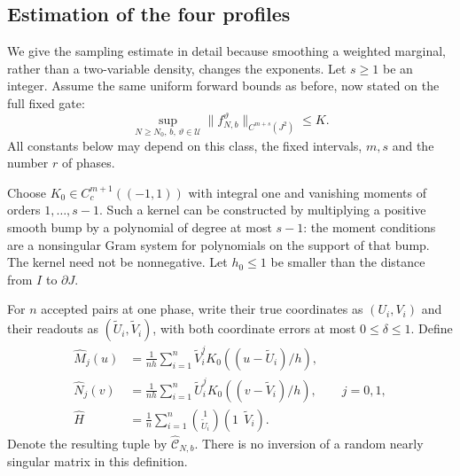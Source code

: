 \subsection{Estimation of the four profiles}

We give the sampling estimate in detail because smoothing a weighted
marginal, rather than a two-variable density, changes the exponents.
Let $s\ge1$ be an integer.  Assume the same uniform forward bounds
as before, now stated on the full fixed gate:
\[
 \sup_{N\ge N_0,\,b,\,\vartheta\in\mathscr U}
                   \|f_{N,b}^{\vartheta}\|_{C^{m+s}(J^2)}\le K.
\]
All constants below may depend on this class, the fixed intervals,
$m,s$ and the number $r$ of phases.

Choose $K_0\in C_c^{m+1}((-1,1))$ with integral one and vanishing
moments of orders $1,\ldots,s-1$.  Such a kernel can be constructed
by multiplying a positive smooth bump by a polynomial of degree at
most $s-1$: the moment conditions are a nonsingular Gram system for
polynomials on the support of that bump.  The kernel need not be
nonnegative.  Let $h_0\le1$ be smaller than the distance from $I$ to
$\partial J$.

For $n$ accepted pairs at one phase, write their true coordinates as
$(U_i,V_i)$ and their readouts as $(\widetilde U_i,\widetilde V_i)$,
with both coordinate errors at most $0\le\delta\le1$.  Define
\begin{align}
 \widehat M_j(u)&=\frac1{nh}\sum_{i=1}^n\widetilde V_i^j
                   K_0((u-\widetilde U_i)/h),\label{eq:v74-est-M}\\
 \widehat N_j(v)&=\frac1{nh}\sum_{i=1}^n\widetilde U_i^j
                   K_0((v-\widetilde V_i)/h),\qquad j=0,1,\\
 \widehat H&=\frac1n\sum_{i=1}^n
                      \binom{1}{\widetilde U_i}(1\ \ \widetilde V_i).
                      \label{eq:v74-est-H}
\end{align}
Denote the resulting tuple by $\widehat{\mathcal C}_{N,b}$.  There
is no inversion of a random nearly singular matrix in this definition.

